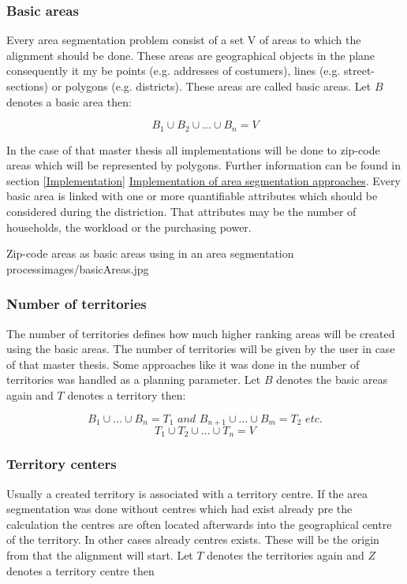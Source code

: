 \subsubsection{Basic areas}
Every area segmentation problem consist of a set V of areas to which the alignment should be done. These areas are geographical objects in the plane consequently it my be points (e.g. addresses of costumers), lines (e.g. street-sections) or polygons (e.g. districts). These areas are called basic areas. Let $ B $ denotes a basic area then:

\[ \mathit{B_{1} \cup B_{2} \cup ... \cup B_{n}=V} \]

In the case of that master thesis all implementations will be done to zip-code areas which will be represented by polygons. Further information can be found in section \ref{Implementation} \hyperref[Implementation]{Implementation of area segmentation approaches}. Every basic area is linked with one or more quantifiable attributes which should be considered during the distriction. That attributes may be the number of households, the workload or the purchasing power.

\begin{figureOwn}{Zip-code areas as basic areas using in an area segmentation process}{images/basicAreas.jpg}\end{figureOwn}

\subsubsection{Number of territories}
The number of territories defines how much higher ranking areas will be created using the basic areas. The number of territories will be given by the user in case of that master thesis. Some approaches like it was done in \citeauthor{kalcsics} \cite{kalcsics} the number of territories was handled as a planning parameter. Let $ B $ denotes the basic areas again and $ T $ denotes a territory then:

\[ \mathit{B_{1} \cup  ... \cup B_{n}=T_{1} \text{ and } B_{n+1} \cup ... \cup B_{m}=T_{2} \text{ etc.}}\]
\[ \mathit{T_{1} \cup  T_{2} \cup ... \cup T_{n}=V}\]

\subsubsection{Territory centers}
Usually a created territory is associated with a territory centre. If the area segmentation was done without centres which had exist already pre the 
calculation the centres are often located afterwards into the geographical centre of the territory. In other cases already centres exists. These will be the origin from that the alignment will start. Let $ T $ denotes the territories again and $ Z $ denotes a territory centre then

